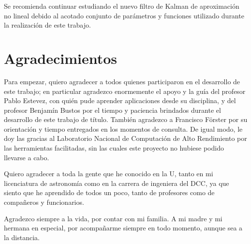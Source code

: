 \begin{preface}
Se recomienda continuar estudiando el nuevo filtro de Kalman de aproximaci\'on no lineal debido al acotado conjunto de par\'ametros y funciones utilizado durante la realizaci\'on de este trabajo.



\section{Agradecimientos}

Para empezar, quiero agradecer a todos quienes participaron en el desarrollo de este trabajo; en particular agradezco enormemente el apoyo y la gu\'ia del profesor Pablo Estevez, con qui\'en pude aprender aplicaciones desde su disciplina, y del profesor Benjam\'in Bustos por el tiempo y paciencia brindados durante el desarrollo de este trabajo de t\'itulo. Tambi\'en agradezco a Francisco F\"orster por su orientaci\'on y tiempo entregados en los momentos de consulta. De igual modo, le doy las gracias al Laboratorio Nacional de Computaci\'on de Alto Rendimiento por las herramientas facilitadas, sin las cuales este proyecto no hubiese podido llevarse a cabo.
\bigskip

Quiero agradecer a toda la gente que he conocido en la U, tanto en mi licenciatura de astronom\'ia como en la carrera de ingeniera del DCC, ya que siento que he aprendido de todos un poco, tanto de profesores como de compa\~neros y funcionarios.   
\bigskip

Agradezco siempre a la vida, por contar con mi familia. A mi madre y mi hermana en especial, por acompa\~narme siempre en todo momento, aunque sea a la distancia. 


\begin{flushright}
\makeatletter
	\@author
\makeatother
\end{flushright}

\end{preface}